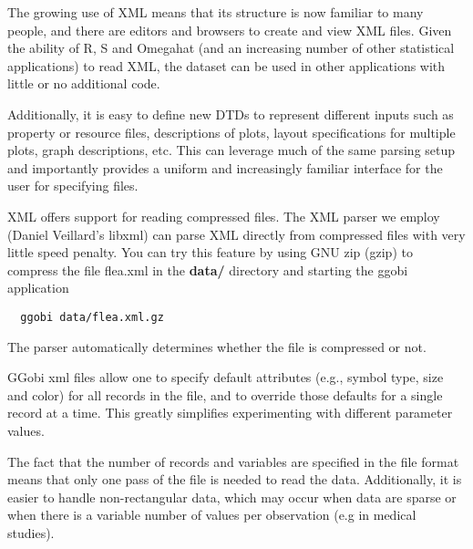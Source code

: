\documentclass{article}
\def\strip#1>{}
\def\Escape#1{\def\next{#1}%
  {\frenchspacing\expandafter\strip\meaning\next}}
\def\dir#1{\textbf{\Escape{#1/}}}
\def\directory#1{\dir{#1}}
\begin{document}
The growing use of XML means that its structure is now familiar to
many people, and there are editors and browsers to create and view XML
files.  Given the ability of R, S and Omegahat (and an increasing
number of other statistical applications) to read XML, the dataset can
be used in other applications with little or no additional code.


Additionally, it is easy to define new DTDs to represent different
inputs such as property or resource files, descriptions of plots,
layout specifications for multiple plots, graph descriptions, etc.
This can leverage much of the same parsing setup and importantly
provides a uniform and increasingly familiar interface for the user
for specifying files.


XML offers support for reading compressed files.  The XML parser we
employ (Daniel Veillard's libxml) can parse XML directly from
compressed files with very little speed penalty.  You can try this
feature by using GNU zip (gzip) to compress the file flea.xml in the
\directory{data} directory and starting the ggobi application
\begin{verbatim}
  ggobi data/flea.xml.gz
\end{verbatim}
The parser automatically determines whether the file is compressed or
not.



GGobi xml files allow one to specify default attributes (e.g., symbol
type, size and color) for all records in the file, and to override
those defaults for a single record at a time.  This greatly simplifies
experimenting with different parameter values.


The fact that the number of records and variables are specified in the
file format means that only one pass of the file is needed to read the
data.  Additionally, it is easier to handle non-rectangular data,
which may occur when data are sparse or when there is a variable number
of values per observation (e.g in medical studies).
\end{document}
